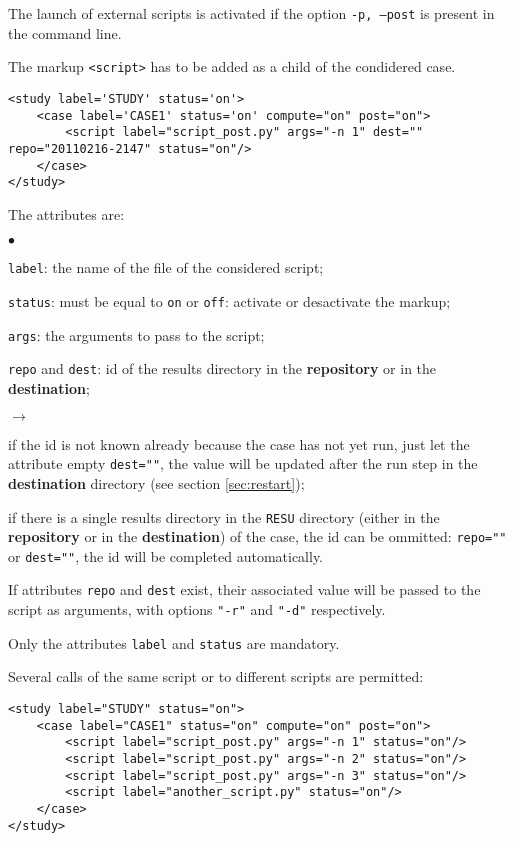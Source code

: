 \documentclass[a4paper,10pt,twoside]{csshortdoc}
\begin{document}
The launch of external scripts is activated if the option \texttt{-p, --post}
is present in the command line.

The markup \texttt{<script>} has to be added as a child of the condidered case.

\small
\begin{verbatim}
<study label='STUDY' status='on'>
    <case label='CASE1' status='on' compute="on" post="on">
        <script label="script_post.py" args="-n 1" dest="" repo="20110216-2147" status="on"/>
    </case>
</study>
\end{verbatim}
\normalsize

The attributes are:
\begin{list}{$\bullet$}{}
\item \texttt{label}: the name of the file of the considered script;
\item \texttt{status}: must be equal to \texttt{on} or \texttt{off}:
activate or desactivate the markup;
\item \texttt{args}: the arguments to pass to the script;
\item \texttt{repo} and \texttt{dest}: id of the results directory in the
\textbf{repository} or in the \textbf{destination};
\begin{list}{$\rightarrow$}{}
\item if the id is not known already because the case has not yet run, just let
the attribute empty \texttt{dest=""}, the value will be updated after the run
step in the \textbf{destination} directory (see section \ref{sec:restart});
\item if there is a single results directory in the \texttt{RESU} directory
(either in the \textbf{repository} or in the \textbf{destination}) of the case,
the id can be ommitted: \texttt{repo=""} or \texttt{dest=""}, the id will be
completed automatically.
\end{list}
If attributes \texttt{repo} and \texttt{dest} exist, their associated value
will be passed to the script as arguments, with options \texttt{"-r"} and
\texttt{"-d"} respectively.
\end{list}

Only the attributes \texttt{label} and \texttt{status} are mandatory.

Several calls of the same script or to different scripts are permitted:
\small
\begin{verbatim}
<study label="STUDY" status="on">
    <case label="CASE1" status="on" compute="on" post="on">
        <script label="script_post.py" args="-n 1" status="on"/>
        <script label="script_post.py" args="-n 2" status="on"/>
        <script label="script_post.py" args="-n 3" status="on"/>
        <script label="another_script.py" status="on"/>
    </case>
</study>
\end{verbatim}
\normalsize
\end{document}
